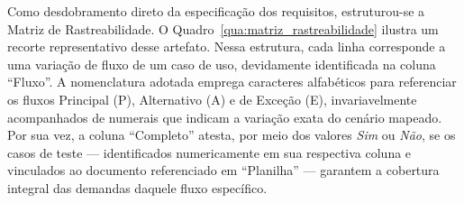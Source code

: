 

Como desdobramento direto da especificação dos requisitos, estruturou-se a Matriz de Rastreabilidade. O Quadro~\ref{qua:matriz_rastreabilidade} ilustra um recorte representativo desse artefato. Nessa estrutura, cada linha corresponde a uma variação de fluxo de um caso de uso, devidamente identificada na coluna ``Fluxo''. A nomenclatura adotada emprega caracteres alfabéticos para referenciar os fluxos Principal (P), Alternativo (A) e de Exceção (E), invariavelmente acompanhados de numerais que indicam a variação exata do cenário mapeado. Por sua vez, a coluna ``Completo'' atesta, por meio dos valores \textit{Sim} ou \textit{Não}, se os casos de teste — identificados numericamente em sua respectiva coluna e vinculados ao documento referenciado em ``Planilha'' — garantem a cobertura integral das demandas daquele fluxo específico.


